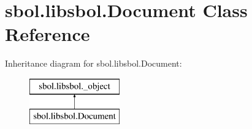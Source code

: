 \hypertarget{classsbol_1_1libsbol_1_1_document}{}\section{sbol.\+libsbol.\+Document Class Reference}
\label{classsbol_1_1libsbol_1_1_document}
Inheritance diagram for sbol.\+libsbol.\+Document\+:\begin{figure}[H]
\begin{center}
\leavevmode
\includegraphics[height=2.000000cm]{classsbol_1_1libsbol_1_1_document}
\end{center}
\end{figure}
